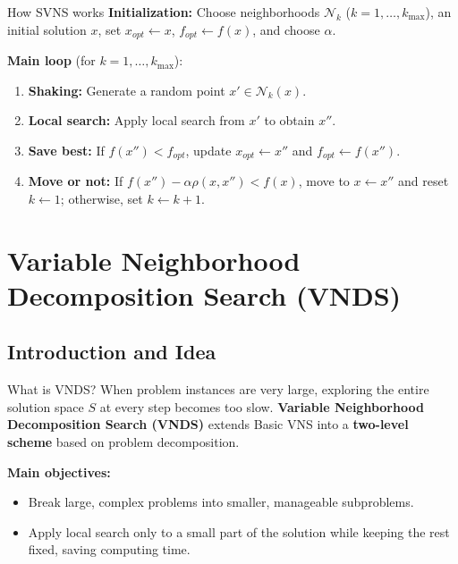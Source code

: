 \documentclass{beamer}
\begin{document}
\begin{frame}{How SVNS works}
\textbf{Initialization:} Choose neighborhoods $\mathcal{N}_k$ ($k = 1, \dots, k_{\max}$), an initial solution $x$, set $x_{opt} \leftarrow x$, $f_{opt} \leftarrow f(x)$, and choose $\alpha$.

\vspace{0.5cm}
\textbf{Main loop} (for $k = 1, \dots, k_{\max}$):
\vspace{0.1cm}
\begin{enumerate}
\item \textbf{Shaking:} Generate a random point $x' \in \mathcal{N}_k(x)$.
\item \textbf{Local search:} Apply local search from $x'$ to obtain $x''$.
\item \textbf{Save best:} If $f(x'') < f_{opt}$, update $x_{opt} \leftarrow x''$ and $f_{opt} \leftarrow f(x'')$.
\item \textbf{Move or not:} If $f(x'') - \alpha \rho(x, x'') < f(x)$, move to $x \leftarrow x''$ and reset $k \leftarrow 1$; otherwise, set $k \leftarrow k + 1$.
\end{enumerate}

\vspace{0.15cm}
\end{frame}




\section{Variable Neighborhood Decomposition Search (VNDS)}

\subsection{Introduction and Idea}
\begin{frame}{What is VNDS?}
\quad When problem instances are very large, exploring the entire solution space $S$ at every step becomes too slow. \textbf{Variable Neighborhood Decomposition Search (VNDS)} extends Basic VNS into a \textbf{two-level scheme} based on problem decomposition.

\vspace{0.3cm}
\textbf{Main objectives:}
\begin{itemize}
\item Break large, complex problems into smaller, manageable subproblems.
\item Apply local search only to a small part of the solution while keeping the rest fixed, saving computing time.
\end{itemize}

\vspace{0.3cm}
\end{frame}
\end{document}
